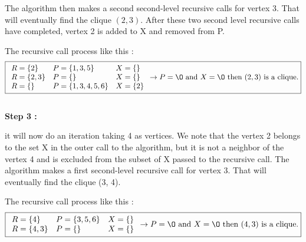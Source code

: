 \begin{minipage}{0.6\textwidth}
    The algorithm then makes a second second-level recursive calls for vertex 3. That will eventually find the clique $(2,3)$. After these two second level recursive calls have completed, vertex 2 is added to X and removed from P.
\end{minipage}
The recursive call process like this  :
$$ \boxed{
        \begin{array}{lll}
            R = \{2\}   & P = \{1,3,5\}     & X = \{\}  \\
            R = \{2,3\} & P = \{\}          & X = \{\}  \\
            R = \{\}    & P = \{1,3,4,5,6\} & X = \{2\} \\
        \end{array}
        \rightarrow P = \O \text{ and } X = \O \text{ then } (2,3) \text{ is a clique.}
    }$$
\\
\hspace*{1cm}  \textbf{Step 3 :}
\\
\begin{minipage}{0.4\textwidth}
\end{minipage}
\begin{minipage}{0.6\textwidth}
    it will now do an iteration taking 4 as vertices. We note that the vertex 2 belongs to the set X in the outer call to the algorithm, but it is not a neighbor of the vertex 4 and is excluded from the subset of X passed to the recursive call. The algorithm makes a first second-level recursive call for vertex 3. That will eventually find the clique (3, 4).
\end{minipage}
The recursive call process like this  :
$$ \boxed{
        \begin{array}{lll}
            R = \{4\}   & P = \{3,5,6\} & X = \{\} \\
            R = \{4,3\} & P = \{\}      & X = \{\} \\
        \end{array}
        \rightarrow P = \O \text{ and } X = \O \text{ then } (4,3) \text{ is a clique.}
    }$$
